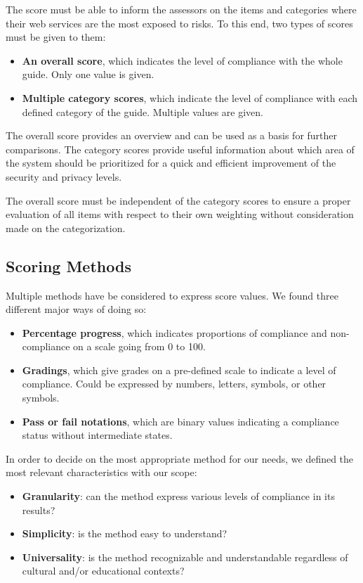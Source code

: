 The score must be able to inform the assessors on the items and categories where their web services are the most exposed to risks. To this end, two types of scores must be given to them:
\begin{itemize}
    \item \textbf{An overall score}, which indicates the level of compliance with the whole guide. Only one value is given.
    \item \textbf{Multiple category scores}, which indicate the level of compliance with each defined category of the guide. Multiple values are given.
\end{itemize}

The overall score provides an overview and can be used as a basis for further comparisons. The category scores provide useful information about which area of the system should be prioritized for a quick and efficient improvement of the security and privacy levels.

The overall score must be independent of the category scores to ensure a proper evaluation of all items with respect to their own weighting without consideration made on the categorization.

\subsection{Scoring Methods}
\label{subsec:proposal_scoring_methods}

Multiple methods have be considered to express score values. We found three different major ways of doing so:
\begin{itemize}
    \item \textbf{Percentage progress}, which indicates proportions of compliance and non-compliance on a scale going from 0 to 100.
    \item \textbf{Gradings}, which give grades on a pre-defined scale to indicate a level of compliance. Could be expressed by numbers, letters, symbols, or other symbols.
    \item \textbf{Pass or fail notations}, which are binary values indicating a compliance status without intermediate states.
\end{itemize}

In order to decide on the most appropriate method for our needs, we defined the most relevant characteristics with our scope:
\begin{itemize}
    \item \textbf{Granularity}: can the method express various levels of compliance in its results?
    \item \textbf{Simplicity}: is the method easy to understand?
    \item \textbf{Universality}: is the method recognizable and understandable regardless of cultural and/or educational contexts?
\end{itemize}

